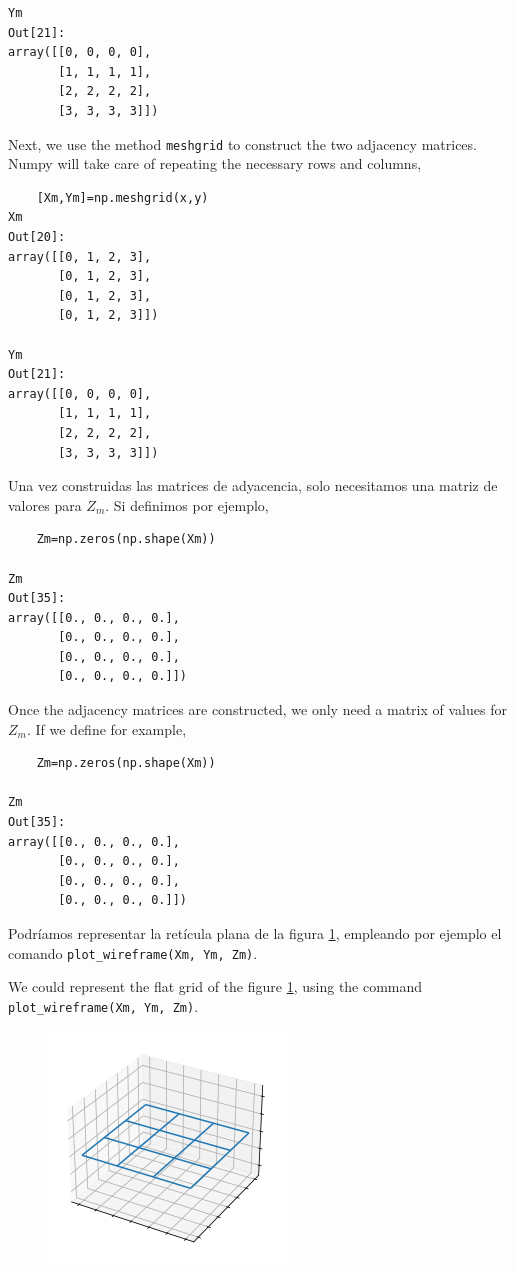 \begin{paracol}{2}
\begin{verbatim}
Ym
Out[21]: 
array([[0, 0, 0, 0],
       [1, 1, 1, 1],
       [2, 2, 2, 2],
       [3, 3, 3, 3]])
\end{verbatim}


\switchcolumn

Next, we use the method \texttt{meshgrid} to construct the two adjacency matrices. Numpy will take care of repeating the necessary rows and columns,


\begin{verbatim}
    [Xm,Ym]=np.meshgrid(x,y)
Xm
Out[20]: 
array([[0, 1, 2, 3],
       [0, 1, 2, 3],
       [0, 1, 2, 3],
       [0, 1, 2, 3]])

Ym
Out[21]: 
array([[0, 0, 0, 0],
       [1, 1, 1, 1],
       [2, 2, 2, 2],
       [3, 3, 3, 3]])
\end{verbatim}

\switchcolumn    
Una vez construidas las matrices de adyacencia, solo necesitamos una matriz de valores para $Z_m$. Si definimos por ejemplo,


\begin{verbatim}
    Zm=np.zeros(np.shape(Xm))

Zm
Out[35]: 
array([[0., 0., 0., 0.],
       [0., 0., 0., 0.],
       [0., 0., 0., 0.],
       [0., 0., 0., 0.]])
\end{verbatim}

\switchcolumn
Once the adjacency matrices are constructed, we only need a matrix of values for $Z_m$. If we define for example,

\begin{verbatim}
    Zm=np.zeros(np.shape(Xm))

Zm
Out[35]: 
array([[0., 0., 0., 0.],
       [0., 0., 0., 0.],
       [0., 0., 0., 0.],
       [0., 0., 0., 0.]])
\end{verbatim}

\switchcolumn
Podríamos representar la retícula plana de la figura \ref{fig:mesh}, empleando por ejemplo el comando \texttt{plot\_wireframe(Xm, Ym, Zm)}.

\switchcolumn
We could represent the flat grid of the figure \ref{fig:mesh}, using the command \texttt{plot\_wireframe(Xm, Ym, Zm)}.

\end{paracol}

\begin{figure}
    \centering
    \includegraphics[width=0.5\linewidth]{figuras/reticula.png}
    \label{fig:mesh}
\end{figure}

